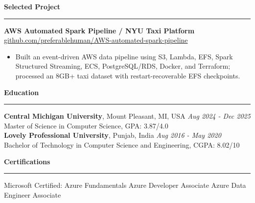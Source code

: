 \documentclass[10pt,letterpaper]{article}
\newcommand{\ressection}[1]{\vspace{3pt}\par\textbf{#1}\par\vspace{0.8pt}\hrule\vspace{1.7pt}}
\begin{document}
\ressection{Selected Project}
\textbf{AWS Automated Spark Pipeline / NYU Taxi Platform} \hfill \href{https://github.com/preferablehuman/AWS-automated-spark-pipeline}{github.com/preferablehuman/AWS-automated-spark-pipeline}
\begin{itemize}
  \item Built an event-driven AWS data pipeline using S3, Lambda, EFS, Spark Structured Streaming, ECS, PostgreSQL/RDS, Docker, and Terraform; processed an 8GB+ taxi dataset with restart-recoverable EFS checkpoints.
\end{itemize}

\ressection{Education}
\textbf{Central Michigan University}, Mount Pleasant, MI, USA \hfill \textit{Aug 2024 - Dec 2025}\\
Master of Science in Computer Science, GPA: 3.87/4.0\\
\textbf{Lovely Professional University}, Punjab, India \hfill \textit{Aug 2016 - May 2020}\\
Bachelor of Technology in Computer Science and Engineering, CGPA: 8.02/10

\ressection{Certifications}
Microsoft Certified: Azure Fundamentals \textbar{} Azure Developer Associate \textbar{} Azure Data Engineer Associate
\end{document}
